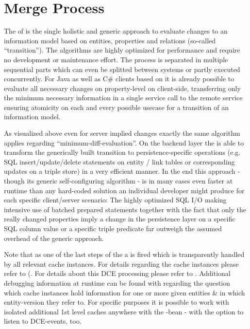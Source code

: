 \section{Merge Process}
\label{feature:MergeProcess}
\ClearAPI
The  of \AMBETH{} is the single holistic and generic approach to evaluate changes to an information model based on entities, properties and relations (so-called ``transition''). The algorithms are highly optimized for performance and require no development or maintenance effort. The process is separated in multiple sequential parts which can even be splitted between systems or partly executed concurrently. For Java as well as C\# clients based on \AMBETH{} it is already possible to evaluate all necessary changes on property-level on client-side, transferring only the minimum necessary information in a single service call to the remote \AMBETH{} service ensuring atomicity on each and every possible usecase for a transition of an information model.\\

\def\showimgref{img/gen/2012-02-01-DeK-Ambeth-Cache-and-Merge-Process-3}

As visualized above even for server implied changes exactly the same algorithm applies regarding ``minimum-diff-evaluation''. On the backend layer the \AMBETH{}  is able to transform the generically built transition to persistence-specific operations (e.g. SQL insert/update/delete statements on entity / link tables or corresponding updates on a triple store) in a very efficient manner. In the end this approach - though its generic self-configuring algorithm - is in many cases even faster at runtime than any hard-coded solution an individual developer might produce for each specific client/server scenario: The highly optimized SQL I/O making intensive use of batched prepared statements together with the fact that only the really changed properties imply a change in the persistence layer on a specific SQL column value or a specific triple predicate far outweigh the assumed overhead of the generic \AMBETH{} approach.

Note that as one of the last steps of the  a  is fired which is transparently handled by all relevant cache instances. For details regarding the cache instances please refer to (. For details about this DCE processing please refer to . Additional debugging information at runtime can be found with  regarding the question which cache instances hold information for one or more given entities \& in which entity-version they refer to. For specific purposes it is possible to work with isolated additional 1st level caches anywhere with the -bean - with the option to listen to DCE-events, too.

